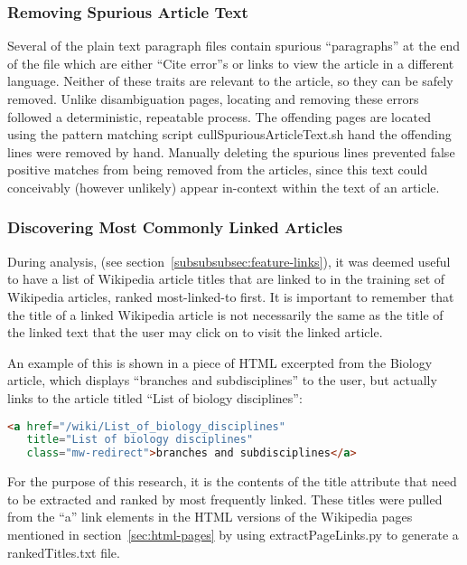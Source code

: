 \subsubsection{Removing Spurious Article Text}

Several of the plain text paragraph files contain spurious ``paragraphs'' at the end of the file which are either ``Cite error''s or links to view the article in a different language.
Neither of these traits are relevant to the article, so they can be safely removed.
Unlike disambiguation pages, locating and removing these errors followed a deterministic, repeatable process.
The offending pages are located using the pattern matching script cullSpuriousArticleText.sh hand the offending lines were removed by hand.
Manually deleting the spurious lines prevented false positive matches from being removed from the articles, since this text could conceivably (however unlikely) appear in-context within the text of an article.

\subsubsection{Discovering Most Commonly Linked Articles}
\label{sec:ranked-titles}

During analysis, (see section~\ref{subsubsubsec:feature-links}), it was deemed useful to have a list of Wikipedia article titles that are linked to in the training set of Wikipedia articles, ranked most-linked-to first.
It is important to remember that the title of a linked Wikipedia article is not necessarily the same as the title of the linked text that the user may click on to visit the linked article.

An example of this is shown in a piece of HTML excerpted from the Biology article, which displays ``branches and subdisciplines'' to the user, but actually links to the article titled ``List of biology disciplines'':
\begin{lstlisting}[language=HTML]
<a href="/wiki/List_of_biology_disciplines"
   title="List of biology disciplines"
   class="mw-redirect">branches and subdisciplines</a>
\end{lstlisting}
\noindent For the purpose of this research, it is the contents of the title attribute that need to be extracted and ranked by most frequently linked.
These titles were pulled from the ``a'' link elements in the HTML versions of the Wikipedia pages mentioned in section~\ref{sec:html-pages} by using extractPageLinks.py to generate a rankedTitles.txt file.

